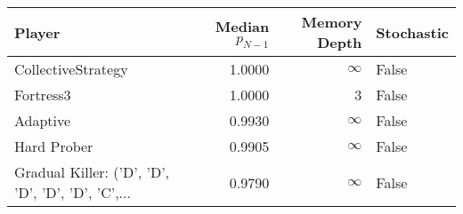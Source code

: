 \begin{tabular}{lrrl}
\toprule
                                            Player &  Median $p_{N-1}$ &  Memory Depth & Stochastic \\
\midrule
                                CollectiveStrategy &            1.0000 &            \(\infty\) &      False \\
                                         Fortress3 &            1.0000 &             3 &      False \\
                                          Adaptive &            0.9930 &            \(\infty\) &      False \\
                                       Hard Prober &            0.9905 &            \(\infty\) &      False \\
 Gradual Killer: ('D', 'D', 'D', 'D', 'D', 'C',... &            0.9790 &            \(\infty\) &      False \\
\bottomrule
\end{tabular}
